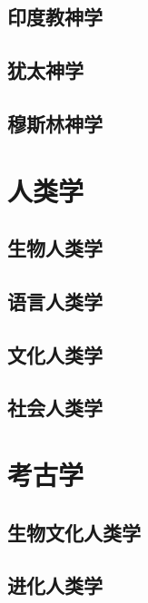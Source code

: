 \section{印度教神学}
\section{犹太神学}
\section{穆斯林神学}


\chapter{人类学}
\section{生物人类学}
\section{语言人类学}
\section{文化人类学}
\section{社会人类学}

\chapter{考古学}
\section{生物文化人类学}
\section{进化人类学}
